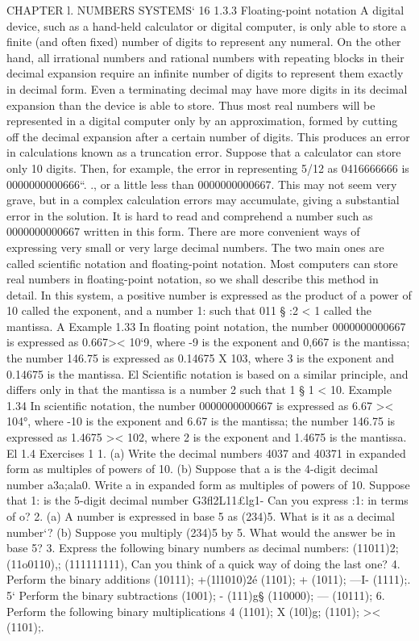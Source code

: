 CHAPTER l. NUMBERS SYSTEMS‘ 16
1.3.3 Floating-point notation
A digital device, such as a hand-held calculator or digital computer, is only able to store a ﬁnite
(and often ﬁxed) number of digits to represent any numeral. On the other hand, all irrational
numbers and rational numbers with repeating blocks in their decimal expansion require an inﬁnite
number of digits to represent them exactly in decimal form. Even a terminating decimal may have
more digits in its decimal expansion than the device is able to store. Thus most real numbers will
be represented in a digital computer only by an approximation, formed by cutting off the decimal
expansion after a certain number of digits. This produces an error in calculations known as a
truncation error.
Suppose that a calculator can store only 10 digits. Then, for example, the error in representing
5/12 as 0416666666 is 0000000000666“. ., or a little less than 0000000000667. This may not seem
very grave, but in a complex calculation errors may accumulate, giving a substantial error in the
solution.
It is hard to read and comprehend a number such as 0000000000667 written in this form. There are
more convenient ways of expressing very small or very large decimal numbers. The two main ones
are called scientiﬁc notation and ﬂoating-point notation. Most computers can store real numbers
in ﬂoating-point notation, so we shall describe this method in detail. In this system, a positive
number is expressed as the product of a power of 10 called the exponent, and a number 1: such
that 011 § :2 < 1 called the mantissa. A
Example 1.33 In ﬂoating point notation, the number 0000000000667 is expressed as 0.667>< 10‘9,
where -9 is the exponent and 0,667 is the mantissa; the number 146.75 is expressed as 0.14675 X 103,
where 3 is the exponent and 0.14675 is the mantissa. El
Scientiﬁc notation is based on a similar principle, and differs only in that the mantissa is a
number 2 such that 1 § 1 < 10.
Example 1.34 In scientiﬁc notation, the number 0000000000667 is expressed as 6.67 >< 104°,
where -10 is the exponent and 6.67 is the mantissa; the number 146.75 is expressed as 1.4675 >< 102,
where 2 is the exponent and 1.4675 is the mantissa. El
1.4 Exercises 1
1. (a) Write the decimal numbers 4037 and 40371 in expanded form as multiples of powers of
10.
(b) Suppose that a is the 4-digit decimal number a3a;ala0. Write a in expanded form as
multiples of powers of 10. Suppose that 1: is the 5-digit decimal number G3ﬂ2L11£lg1- Can
you express :1: in terms of o?
2. (a) A number is expressed in base 5 as (234)5. What is it as a decimal number‘?
(b) Suppose you multiply (234)5 by 5. What would the answer be in base 5?
3. Express the following binary numbers as decimal numbers:
(11011)2; (11o0110),; (111111111),
Can you think of a quick way of doing the last one?
4. Perform the binary additions
(10111); +(1l1010)2é (1101); + (1011); —I- (1111);.
5‘ Perform the binary subtractions
(1001); - (111)g§ (110000); — (10111);
6. Perform the following binary multiplications 4
(1101); X (10l)g; (1101); >< (1101);.



